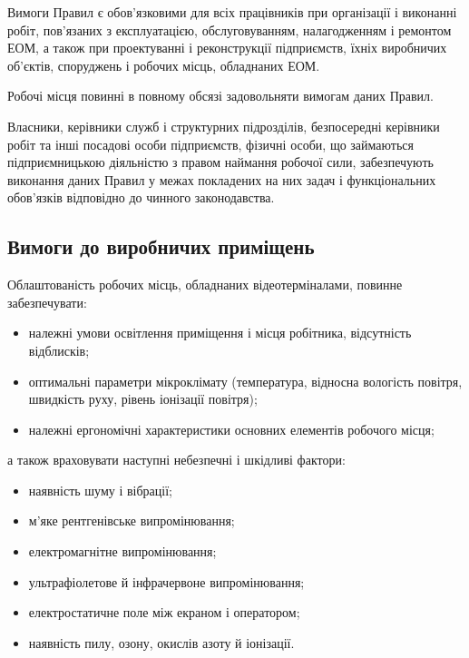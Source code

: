 \documentclass[simple,a4paper,14pt,ukrainian,utf8]{eskdtext}
\begin{document}
\begin{appendices}
                Вимоги Правил є обов'язковими для всіх працівників при організації і виконанні робіт, пов'язаних з експлуатацією, обслуговуванням, налагодженням і ремонтом ЕОМ, а також при проектуванні і реконструкції підприємств, їхніх виробничих об'єктів, споруджень і робочих місць, обладнаних ЕОМ.

                Робочі місця повинні в повному обсязі задовольняти вимогам даних Правил.

                Власники, керівники служб і структурних підрозділів, безпосередні керівники робіт та інші посадові особи підприємств, фізичні особи, що займаються підприємницькою діяльністю з правом наймання робочої сили, забезпечують виконання даних Правил у межах покладених на них задач і функціональних обов'язків відповідно до чинного законодавства.

            \subsection{Вимоги до виробничих приміщень}

                Облаштованість робочих місць, обладнаних відеотерміналами, повинне забезпечувати:

                \begin{itemize}
                    \item належні умови освітлення приміщення і місця робітника, відсутність відблисків;
                    \item оптимальні параметри мікроклімату (температура, відносна вологість повітря, швидкість руху, рівень іонізації повітря);
                    \item належні ергономічні характеристики основних елементів робочого місця;
                \end{itemize}

                а також враховувати наступні небезпечні і шкідливі фактори:

                \begin{itemize}
                    \item наявність шуму і вібрації;
                    \item м'яке рентгенівське випромінювання;
                    \item електромагнітне випромінювання;
                    \item ультрафіолетове й інфрачервоне випромінювання;
                    \item електростатичне поле між екраном і оператором;
                    \item наявність пилу, озону, окислів азоту й іонізації.
                \end{itemize}


\end{appendices}
\end{document}
